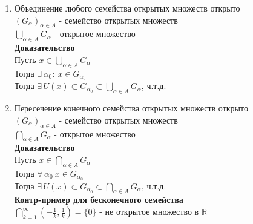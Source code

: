 \documentclass[12pt]{article}
\begin{document}
\begin{enumerate}
    \item Объединение любого семейства открытых множеств открыто\\
    $(G_\alpha)_{\alpha \in A}$ - семейство открытых множеств\\
    $\bigcup_{\alpha \in A} G_\alpha$ - открытое множество\\
    \textbf{Доказательство}\\
    Пусть $x \in \bigcup_{\alpha \in A} G_\alpha$\\
    Тогда $\exists\,\alpha_0:\ x\in G_{\alpha_0}$\\
    Тогда $\exists\,U(x) \subset G_{\alpha_0} \subset \bigcup_{\alpha \in A} G_\alpha$, ч.т.д.
    \item Пересечение конечного семейства открытых множеств открыто\\
    $(G_\alpha)_{\alpha \in A}$ - семейство открытых множеств\\
    $\bigcap_{\alpha \in A} G_\alpha$ - открытое множество\\
    \textbf{Доказательство}\\
    Пусть $x \in \bigcap_{\alpha \in A} G_\alpha$\\
    Тогда $\forall\,\alpha_0\ x\in G_{\alpha_0}$\\
    Тогда $\exists\,U(x) \subset G_{\alpha_0} \subset \bigcap_{\alpha \in A} G_\alpha$, ч.т.д.\\
    \textbf{Контр-пример для бесконечного семейства}\\
    $\bigcap_{k=1}^\infty (-\frac 1k, \frac 1k) = \{0\}$ - не открытое множество в $\mathbb{R}$
\end{enumerate} 
\end{document}
